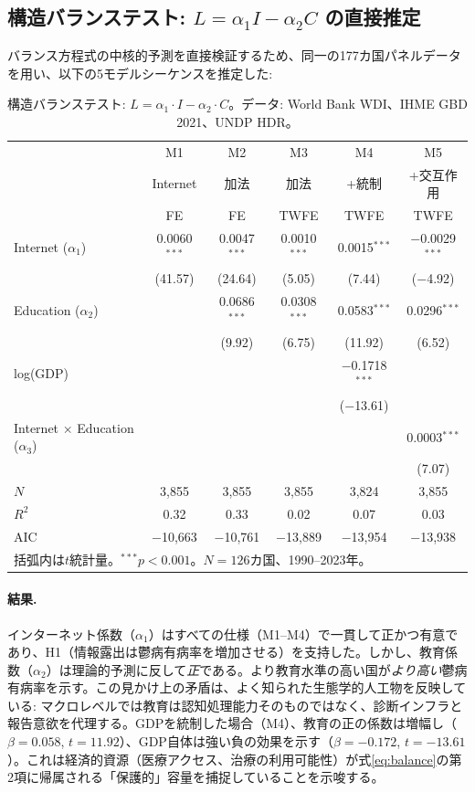 \documentclass[a4paper,11pt,titlepage]{article}
\begin{document}
\subsection{構造バランステスト: $L = \alpha_1 I - \alpha_2 C$ の直接推定}\label{sec:structural-balance}

バランス方程式の中核的予測を直接検証するため、同一の177カ国パネルデータを用い、以下の5モデルシーケンスを推定した:

\begin{table}[htbp]
\centering
\caption{構造バランステスト: $L = \alpha_1 \cdot I - \alpha_2 \cdot C$。データ: World Bank WDI、IHME GBD 2021、UNDP HDR。}
\label{tab:structural-balance}
\small
\begin{tabular}{lccccc}
\toprule
& M1 & M2 & M3 & M4 & M5 \\
& Internet & 加法 & 加法 & +統制 & +交互作用 \\
& FE & FE & TWFE & TWFE & TWFE \\
\midrule
Internet ($\alpha_1$) & 0.0060$^{***}$ & 0.0047$^{***}$ & 0.0010$^{***}$ & 0.0015$^{***}$ & $-$0.0029$^{***}$ \\
& (41.57) & (24.64) & (5.05) & (7.44) & ($-$4.92) \\
Education ($\alpha_2$) &  & 0.0686$^{***}$ & 0.0308$^{***}$ & 0.0583$^{***}$ & 0.0296$^{***}$ \\
&  & (9.92) & (6.75) & (11.92) & (6.52) \\
log(GDP) &  &  &  & $-$0.1718$^{***}$ &  \\
&  &  &  & ($-$13.61) &  \\
Internet $\times$ Education ($\alpha_3$) &  &  &  &  & 0.0003$^{***}$ \\
&  &  &  &  & (7.07) \\
\midrule
$N$ & 3,855 & 3,855 & 3,855 & 3,824 & 3,855 \\
$R^2$ & 0.32 & 0.33 & 0.02 & 0.07 & 0.03 \\
AIC & $-$10,663 & $-$10,761 & $-$13,889 & $-$13,954 & $-$13,938 \\
\bottomrule
\multicolumn{6}{l}{\scriptsize 括弧内は$t$統計量。$^{***}p < 0.001$。$N = 126$カ国、1990--2023年。}
\end{tabular}
\end{table}

\paragraph{結果.} インターネット係数（$\alpha_1$）はすべての仕様（M1--M4）で一貫して正かつ有意であり、H1（情報露出は鬱病有病率を増加させる）を支持した。しかし、教育係数（$\alpha_2$）は理論的予測に反して\textit{正}である。より教育水準の高い国が\textit{より高い}鬱病有病率を示す。この見かけ上の矛盾は、よく知られた生態学的人工物を反映している: マクロレベルでは教育は認知処理能力そのものではなく、診断インフラと報告意欲を代理する。GDPを統制した場合（M4）、教育の正の係数は増幅し（$\beta = 0.058$, $t = 11.92$）、GDP自体は強い負の効果を示す（$\beta = -0.172$, $t = -13.61$）。これは経済的資源（医療アクセス、治療の利用可能性）が式\eqref{eq:balance}の第2項に帰属される「保護的」容量を捕捉していることを示唆する。
\end{document}
